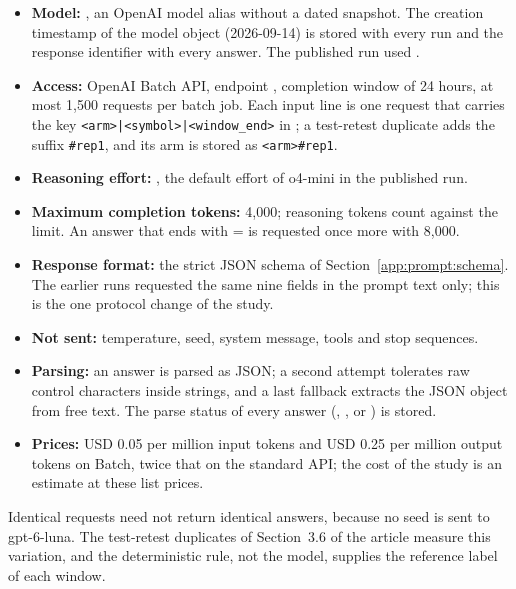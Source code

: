 \begin{itemize}[leftmargin=*,labelsep=5.5mm]
\item \textbf{Model:} , an OpenAI model alias without a dated snapshot. The creation timestamp of the model object (2026-09-14) is stored with every run and the response identifier with every answer. The published run used .
\item \textbf{Access:} OpenAI Batch API, endpoint , completion window of 24 hours, at most 1{,}500 requests per batch job. Each input line is one request that carries the key \texttt{<arm>|<symbol>|<window\_end>} in ; a test-retest duplicate adds the suffix \texttt{\#rep1}, and its arm is stored as \texttt{<arm>\#rep1}.
\item \textbf{Reasoning effort:} , the default effort of o4-mini in the published run.
\item \textbf{Maximum completion tokens:} 4{,}000; reasoning tokens count against the limit. An answer that ends with  =  is requested once more with 8{,}000.
\item \textbf{Response format:} the strict JSON schema of Section~\ref{app:prompt:schema}. The earlier runs requested the same nine fields in the prompt text only; this is the one protocol change of the study.
\item \textbf{Not sent:} temperature, seed, system message, tools and stop sequences.
\item \textbf{Parsing:} an answer is parsed as JSON; a second attempt tolerates raw control characters inside strings, and a last fallback extracts the JSON object from free text. The parse status of every answer (, ,  or ) is stored.
\item \textbf{Prices:} USD 0.05 per million input tokens and USD 0.25 per million output tokens on Batch, twice that on the standard API; the cost of the study is an estimate at these list prices.
\end{itemize}

Identical requests need not return identical answers, because no seed is sent to gpt-6-luna. The test-retest duplicates of Section~3.6 of the article measure this variation, and the deterministic rule, not the model, supplies the reference label of each window.

